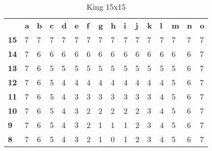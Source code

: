 \documentclass{article}
\begin{document}
\begin{table}[H]
\centering
\caption{King 15x15}
\label{my-label}
\begin{tabular}{llllllllllllllll}
                                 & \textbf{a} & \textbf{b} & \textbf{c} & \textbf{d} & \textbf{e} & \textbf{f} & \textbf{g} & \textbf{h} & \textbf{i} & \textbf{j} & \textbf{k} & \textbf{l} & \textbf{m} & \textbf{n} & \textbf{o} \\ \cline{2-16} 
\multicolumn{1}{l|}{\textbf{15}} & 7          & 7          & 7          & 7          & 7          & 7          & 7          & 7          & 7          & 7          & 7          & 7          & 7          & 7          & 7          \\
\multicolumn{1}{l|}{\textbf{14}} & 7          & 6          & 6          & 6          & 6          & 6          & 6          & 6          & 6          & 6          & 6          & 6          & 6          & 6          & 7          \\
\multicolumn{1}{l|}{\textbf{13}} & 7          & 6          & 5          & 5          & 5          & 5          & 5          & 5          & 5          & 5          & 5          & 5          & 5          & 6          & 7          \\
\multicolumn{1}{l|}{\textbf{12}} & 7          & 6          & 5          & 4          & 4          & 4          & 4          & 4          & 4          & 4          & 4          & 4          & 5          & 6          & 7          \\
\multicolumn{1}{l|}{\textbf{11}} & 7          & 6          & 5          & 4          & 3          & 3          & 3          & 3          & 3          & 3          & 3          & 4          & 5          & 6          & 7          \\
\multicolumn{1}{l|}{\textbf{10}} & 7          & 6          & 5          & 4          & 3          & 2          & 2          & 2          & 2          & 2          & 3          & 4          & 5          & 6          & 7          \\
\multicolumn{1}{l|}{\textbf{9}}  & 7          & 6          & 5          & 4          & 3          & 2          & 1          & 1          & 1          & 2          & 3          & 4          & 5          & 6          & 7          \\
\multicolumn{1}{l|}{\textbf{8}}  & 7          & 6          & 5          & 4          & 3          & 2          & 1          & 0          & 1          & 2          & 3          & 4          & 5          & 6          & 7          \\

\end{tabular}
\end{table}
\end{document}
